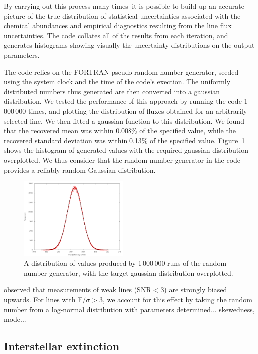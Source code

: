 \documentclass[useAMS,usenatbib]{mn2e}
\begin{document}
By carrying out this process many times, it is possible to build up an accurate picture of the true distribution of statistical uncertainties associated with the chemical abundances and empirical diagnostics resulting from the line flux uncertainties. The code collates all of the results from each iteration, and generates histograms showing visually the uncertainty distributions on the output parameters.

The code relies on the FORTRAN pseudo-random number generator, seeded using the system clock and the time of the code's exection.  The uniformly distributed numbers thus generated are then converted into a gaussian distribution.  We tested the performance of this approach by running the code 1\,000\,000 times, and plotting the distribution of fluxes obtained for an arbitrarily selected line.  We then fitted a gaussian function to this distribution.  We found that the recovered mean was within 0.008\% of the specified value, while the recovered standard deviation was within 0.13\% of the specified value.  Figure~\ref{gaussiantest} shows the histogram of generated values with the required gaussian distribution overplotted.  We thus consider that the random number generator in the code provides a reliably random Gaussian distribution.

\begin{figure}
\includegraphics[width=0.47\textwidth]{figures/gaussian_test.png}
\caption{A distribution of values produced by 1\,000\,000 runs of the random number generator, with the target gaussian distribution overplotted.}
\label{gaussiantest}
\end{figure}

\citet{1994A&A...287..676R} observed that measurements of weak lines (SNR$<$3) are strongly biased upwards.  For lines with F/$\sigma > $3, we account for this effect by taking the random number from a log-normal distribution with parameters determined... skewedness, mode...

\subsection{Interstellar extinction}
\end{document}
